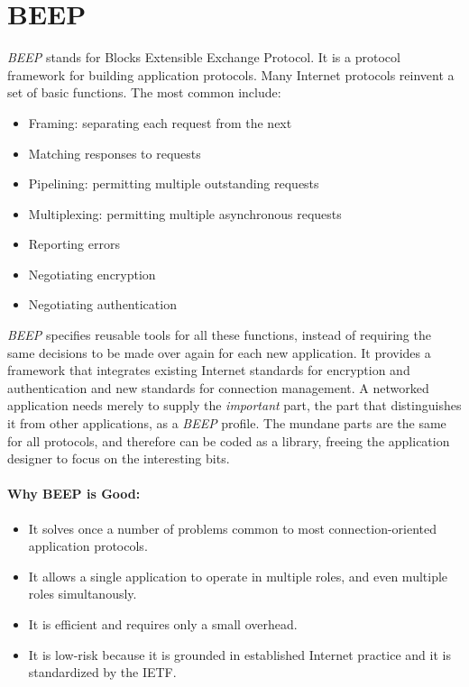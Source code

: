 \section{BEEP}
\emph{BEEP} stands for Blocks Extensible Exchange Protocol. It is a protocol framework for building application protocols. Many Internet protocols reinvent a set of basic functions. The most common include:

\begin{itemize}
 \item Framing: separating each request from the next
 \item Matching responses to requests
 \item Pipelining: permitting multiple outstanding requests
 \item Multiplexing: permitting multiple asynchronous requests
 \item Reporting errors
 \item Negotiating encryption
 \item Negotiating authentication
\end{itemize}

\emph{BEEP} specifies reusable tools for all these functions, instead of requiring the same decisions to be made over again for each new application. It provides a framework that integrates existing Internet standards for encryption and authentication and new standards for connection management. A networked application needs merely to supply the \emph{important} part, the part that distinguishes it from other applications, as a \emph{BEEP} profile. The mundane parts are the same for all protocols, and therefore can be coded as a library, freeing the application designer to focus on the interesting bits.

\paragraph{Why BEEP is Good:}
\begin{itemize}
 \item It solves once a number of problems common to most connection-oriented application protocols.
 \item It allows a single application to operate in multiple roles, and even multiple roles simultanously.
 \item It is efficient and requires only a small overhead.
 \item It is low-risk because it is grounded in established Internet practice and it is standardized by the IETF.
\end{itemize}

